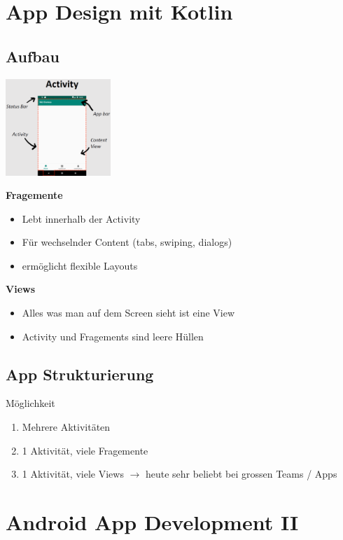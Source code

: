 \documentclass{report}
\newenvironment{Figure}
	{\par\medskip\noindent\minipage{\linewidth}}
	{\endminipage\par\medskip}
\theoremstyle{definition}
\theoremstyle{example}
\begin{document}
\chapter{App Design mit Kotlin}

\section{Aufbau}
\begin{Figure}
   \centering
    \includegraphics[width=150px]{img/Activity.png}
        \label{fig:Activity in Android}
\end{Figure}

\textbf{Fragemente}
\begin{itemize}
   \item Lebt innerhalb der Activity
   \item Für wechselnder Content (tabs, swiping, dialogs)
   \item ermöglicht flexible Layouts
\end{itemize}

\textbf{Views}
\begin{itemize}
   \item Alles was man auf dem Screen sieht ist eine View
   \item Activity und Fragements sind leere Hüllen
\end{itemize}

\section{App Strukturierung}
Möglichkeit
\begin{enumerate}
   \item Mehrere Aktivitäten
   \item 1 Aktivität, viele Fragemente
   \item 1 Aktivität, viele Views $\rightarrow$ heute sehr beliebt bei grossen Teams / Apps
\end{enumerate}



\chapter{Android App Development II}
\end{document}
